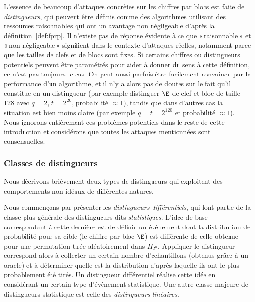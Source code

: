 L'essence de beaucoup d'attaques concrètes sur les chiffres par blocs est faite de \emph{distingueurs}, qui peuvent être définis comme des algorithmes utilisant des ressources
raisonnables qui ont un avantage non négligeable d'après la définition~\ref{def:fprp}.
Il n'existe pas de réponse évidente à ce que «\,raisonnable\,» et «\,non négligeable\,» signifient dans le contexte d'attaques réelles, notamment parce que les tailles de clefs
et de blocs sont fixes. Si certains chiffres ou distingueurs potentiels peuvent être paramétrés pour aider à donner du sens à cette définition, ce n'est pas toujours le cas.
On peut aussi parfois être facilement convaincu par la performance d'un algorithme, et il n'y a alors pas de doutes sur le fait qu'il constitue en un distingueur
(par exemple distinguer $\E$ de clef et bloc de taille 128 avec $q = 2$, $t = 2^{20}$, probabilité $\approx 1$), tandis que dans d'autres cas la situation est bien
moins claire (par exemple $q = t = 2^{120}$ et probabilité $\approx 1$). Nous ignorons entièrement ces problèmes potentiels dans le reste de cette introduction et considérons
que toutes les attaques mentionnées sont consensuelles.

\subsubsection{Classes de distingueurs}

Nous décrivons brièvement deux types de distingueurs qui exploitent des comportements non idéaux de différentes natures.

\bigskip

Nous commençons par présenter les \emph{distingueurs différentiels}, qui font partie de la classe plus générale des distingueurs
dits \emph{statistiques}.
L'idée de base correspondant à cette dernière est de définir un événement dont la distribution de probabilité pour sa cible
(le chiffre par bloc $\E$) est différente de celle obtenue pour une permutation tirée aléatoirement dans $\Pi_{2^n}$.
Appliquer le distingueur correspond alors à collecter un certain nombre d'échantillons (obtenus grâce à un oracle)
et à déterminer quelle est la distribution d'après laquelle ils ont le plus probablement été tirés.
Un distingueur différentiel réalise cette idée en considérant un certain type d'événement statistique. Une autre classe
majeure de distingueurs statistique est celle des \emph{distingueurs linéaires}.

